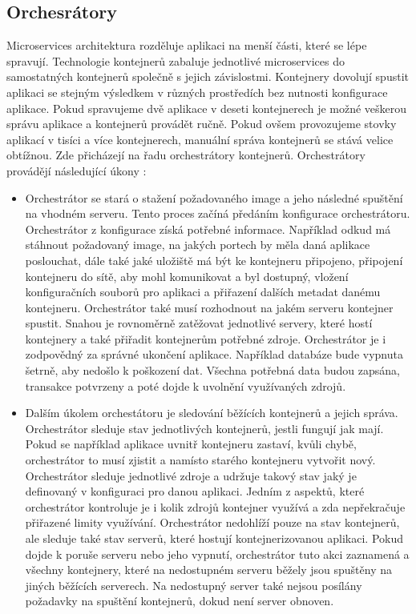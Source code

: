 \subsection{Orchesrátory}
Microservices architektura rozděluje aplikaci na menší části, které se lépe spravují. Technologie kontejnerů zabaluje jednotlivé microservices do samostatných kontejnerů společně s jejich závislostmi. Kontejnery dovolují spustit aplikaci se stejným výsledkem v různých prostředích bez nutnosti konfigurace aplikace. Pokud spravujeme dvě aplikace v deseti kontejnerech je možné veškerou správu aplikace a kontejnerů provádět ručně. Pokud ovšem provozujeme stovky aplikací v tisíci a více kontejnerech, manuální správa kontejnerů se stává velice obtížnou. Zde přicházejí na řadu orchestrátory kontejnerů. Orchestrátory provádějí následující úkony \cite{container-orchestration}:
\begin{itemize}
\item Orchestrátor se stará o stažení požadovaného image a jeho následné spuštění na vhodném serveru. Tento proces začíná předáním konfigurace orchestrátoru. Orchestrátor z konfigurace získá potřebné informace. Například odkud má stáhnout požadovaný image, na jakých portech by měla daná aplikace poslouchat, dále také jaké uložiště má být ke kontejneru připojeno, připojení kontejneru do sítě, aby mohl komunikovat a byl dostupný, vložení konfiguračních souborů pro aplikaci a přiřazení dalších metadat danému kontejneru. Orchestrátor také musí rozhodnout na jakém serveru kontejner spustit. Snahou je rovnoměrně zatěžovat jednotlivé servery, které hostí kontejnery a také přiřadit kontejnerům potřebné zdroje. Orchestrátor je i zodpovědný za správné ukončení aplikace. Například databáze bude vypnuta šetrně, aby nedošlo k poškození dat. Všechna potřebná data budou zapsána, transakce potvrzeny a poté dojde k uvolnění využívaných zdrojů.
\item Dalším úkolem orchestátoru je sledování běžících kontejnerů a jejich správa. Orchestrátor sleduje stav jednotlivých kontejnerů, jestli fungují jak mají. Pokud se například aplikace uvnitř kontejneru zastaví, kvůli chybě, orchestrátor to musí zjistit a namísto starého kontejneru vytvořit nový. Orchestrátor sleduje jednotlivé zdroje a udržuje takový stav jaký je definovaný v konfiguraci pro danou aplikaci. Jedním z aspektů, které orchestrátor kontroluje je i kolik zdrojů kontejner využívá a zda nepřekračuje přiřazené limity využívání. 
Orchestrátor nedohlíží pouze na stav kontejnerů, ale sleduje také stav serverů, které hostují kontejnerizovanou aplikaci. Pokud dojde k poruše serveru nebo jeho vypnutí, orchestrátor tuto akci zaznamená a všechny kontejnery, které na nedostupném serveru běžely jsou spuštěny na jiných běžících serverech. Na nedostupný server také nejsou posílány požadavky na spuštění kontejnerů, dokud není server obnoven.

\end{itemize}
